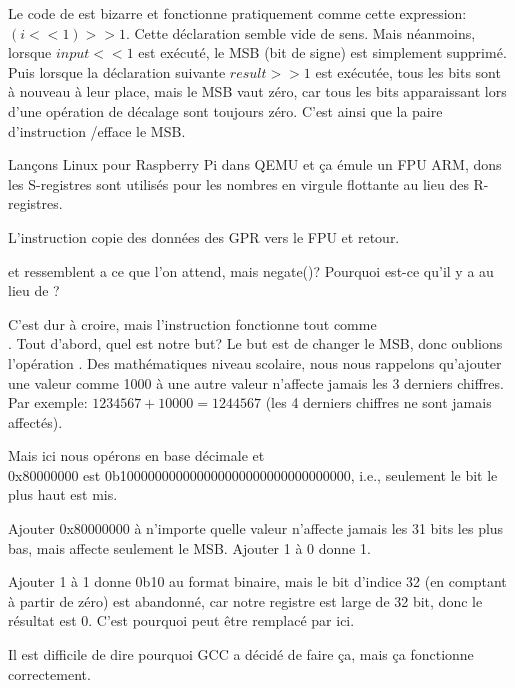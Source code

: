 Le code de  est bizarre et fonctionne pratiquement comme cette expression:
$(i<<1)>>1$.
Cette déclaration semble vide de sens.
Mais néanmoins, lorsque $input<<1$ est exécuté, le \ac{MSB} (bit de signe) est simplement
supprimé.
Puis lorsque la déclaration suivante $result>>1$ est exécutée, tous les bits sont
à nouveau à leur place, mais le \ac{MSB} vaut zéro, car tous les  bits
apparaissant lors d'une opération de décalage sont toujours zéro.
C'est ainsi que la paire d'instruction \LSLS/\LSRS efface le \ac{MSB}.




Lançons Linux pour Raspberry Pi dans QEMU et ça émule un FPU ARM, dons les S-registres
sont utilisés pour les nombres en virgule flottante au lieu des R-registres.


L'instruction \FMRS copie des données des \ac{GPR} vers le FPU et retour.

 et  ressemblent a ce que l'on attend, mais negate()?
Pourquoi est-ce qu'il y a \ADD au lieu de \XOR?

C'est dur à croire, mais l'instruction
 fonctionne tout comme \\
.
Tout d'abord, quel est notre but?
Le but est de changer le \ac{MSB}, donc oublions l'opération \XOR.
Des mathématiques niveau scolaire, nous nous rappelons qu'ajouter une valeur comme
1000 à une autre valeur n'affecte jamais les 3 derniers chiffres.
Par exemple: $1234567 + 10000 = 1244567$ (les 4 derniers chiffres ne sont jamais
affectés).

Mais ici nous opérons en base décimale et\\
0x80000000 est 0b100000000000000000000000000000000, i.e., seulement le bit le plus
haut est mis.

Ajouter 0x80000000 à n'importe quelle valeur n'affecte jamais les 31 bits les plus
bas, mais affecte seulement le \ac{MSB}.
Ajouter 1 à 0 donne 1.

Ajouter 1 à 1 donne 0b10 au format binaire, mais le bit d'indice 32 (en comptant
à partir de zéro) est abandonné, car notre registre est large de 32 bit, donc le
résultat est 0.
C'est pourquoi \XOR peut être remplacé par \ADD ici.

Il est difficile de dire pourquoi GCC a décidé de faire ça, mais ça fonctionne correctement.
